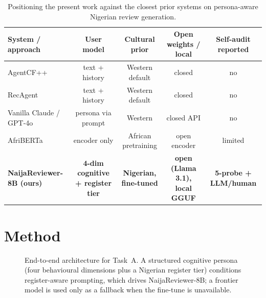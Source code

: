 \documentclass[sigconf,nonacm,balance]{acmart}
\begin{document}
\begin{table}[!t]
\centering
\caption{Positioning the present work against the closest prior systems on
persona-aware Nigerian review generation.}
\label{tab:relatedwork-a}
\small
\begin{tabular}{lcccc}
\toprule
\textbf{System / approach} & \textbf{User model} & \textbf{Cultural prior} &
\textbf{Open weights / local} & \textbf{Self-audit reported} \\
\midrule
AgentCF++~\cite{agentcf}                & text + history             & Western default        & closed          & no \\
RecAgent~\cite{recagent}                & text + history             & Western default        & closed          & no \\
Vanilla Claude / GPT-4o                 & persona via prompt         & Western                & closed API      & no \\
AfriBERTa~\cite{afriberta}              & encoder only               & African pretraining    & open encoder    & limited \\
\textbf{NaijaReviewer-8B (ours)} & \textbf{4-dim cognitive + register tier} & \textbf{Nigerian, fine-tuned} & \textbf{open (Llama 3.1), local GGUF} & \textbf{5-probe + LLM/human}  \\
\bottomrule
\end{tabular}
\end{table}

\section{Method}

\begin{figure}[t]
  \centering
  \caption{End-to-end architecture for Task~A. A structured cognitive persona
  (four behavioural dimensions plus a Nigerian register tier) conditions
  register-aware prompting, which drives NaijaReviewer-8B; a frontier model is
  used only as a fallback when the fine-tune is unavailable.}
  \label{fig:arch-a}
\end{figure}
\end{document}
